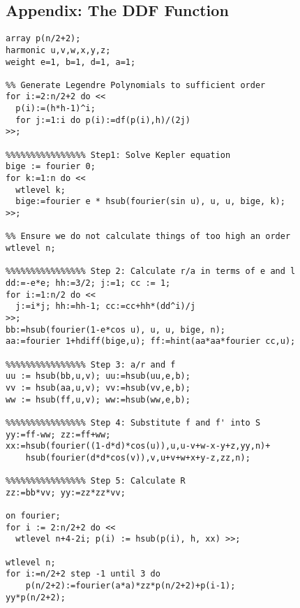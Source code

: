 \subsection*{Appendix: The DDF Function}
\begin{verbatim}
array p(n/2+2);
harmonic u,v,w,x,y,z;
weight e=1, b=1, d=1, a=1;

%% Generate Legendre Polynomials to sufficient order
for i:=2:n/2+2 do <<
  p(i):=(h*h-1)^i;
  for j:=1:i do p(i):=df(p(i),h)/(2j)
>>;

%%%%%%%%%%%%%%%% Step1: Solve Kepler equation
bige := fourier 0;
for k:=1:n do <<
  wtlevel k;
  bige:=fourier e * hsub(fourier(sin u), u, u, bige, k);
>>;

%% Ensure we do not calculate things of too high an order
wtlevel n;

%%%%%%%%%%%%%%%% Step 2: Calculate r/a in terms of e and l
dd:=-e*e; hh:=3/2; j:=1; cc := 1;
for i:=1:n/2 do <<
  j:=i*j; hh:=hh-1; cc:=cc+hh*(dd^i)/j
>>;
bb:=hsub(fourier(1-e*cos u), u, u, bige, n);
aa:=fourier 1+hdiff(bige,u); ff:=hint(aa*aa*fourier cc,u);

%%%%%%%%%%%%%%%% Step 3: a/r and f
uu := hsub(bb,u,v); uu:=hsub(uu,e,b);
vv := hsub(aa,u,v); vv:=hsub(vv,e,b);
ww := hsub(ff,u,v); ww:=hsub(ww,e,b);

%%%%%%%%%%%%%%%% Step 4: Substitute f and f' into S
yy:=ff-ww; zz:=ff+ww;
xx:=hsub(fourier((1-d*d)*cos(u)),u,u-v+w-x-y+z,yy,n)+
    hsub(fourier(d*d*cos(v)),v,u+v+w+x+y-z,zz,n);

%%%%%%%%%%%%%%%% Step 5: Calculate R
zz:=bb*vv; yy:=zz*zz*vv;

on fourier;
for i := 2:n/2+2 do <<
  wtlevel n+4-2i; p(i) := hsub(p(i), h, xx) >>;

wtlevel n;
for i:=n/2+2 step -1 until 3 do
    p(n/2+2):=fourier(a*a)*zz*p(n/2+2)+p(i-1);
yy*p(n/2+2);
\end{verbatim}
